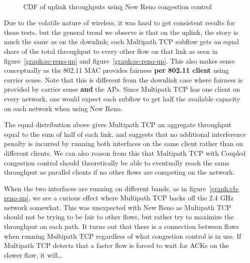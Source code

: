 \begin{figure}[h]
 \centering
 \subfloat[][2.4 GHz, disparate channel] {\
   \scalebox{0.55}{}\label{graph:cc-reno-up}
 }
 \\
 \subfloat[][5 and 2.4 GHz] {\
   \scalebox{0.55}{}\label{graph:cb-reno-up}
 }

 \caption{CDF of uplink throughputs using New Reno congestion control}\label{graph:reno-up}
\end{figure}

Due to the volatile nature of wireless, it was hard to get consistent results
for these tests, but the general trend we observe is that on the uplink, the
story is much the same as on the downlink; each Multipath TCP subflow gets an
equal share of the total throughput to every other flow on that link as seen in
figure~\ref{graph:sc-reno-up} and figure~\ref{graph:sc-reno-up}. This also makes
sense conceptually as the 802.11 MAC provides fairness \textbf{per 802.11
client} using carrier sense. Note that this is different from the downlink case
where fairness is provided by carrier sense \textbf{and} the APs. Since
Multipath TCP has one client on every network, one would expect each subflow to
get half the available capacity on each network when using New Reno.

The equal distribution above gives Multipath TCP an aggregate throughput equal to
the sum of half of each link, and suggests that no additional interference
penalty is incurred by running both interfaces on the same client rather than on
different clients. We can also reason from this that Multipath TCP with Coupled
congestion control should theoretically be able to eventually reach the same
throughput as parallel clients if no other flows are competing on the network.

When the two interfaces are running on different bands, as in
figure~\ref{graph:cb-reno-up}, we see a curious effect where Multipath TCP backs
off the 2.4 GHz network somewhat. This was unexpected with New Reno as Multipath
TCP should not be trying to be fair to other flows, but rather try to maximize
the throughput on each path. It turns out that there is a connection between
flows when running Multipath TCP regardless of what congestion control is in
use. If Multipath TCP detects that a faster flow is forced to wait for ACKs on %
the slower flow, it will… %

